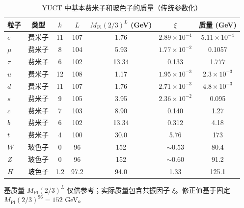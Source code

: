 \documentclass[11pt,a4paper]{article}
\begin{document}
	\begin{table}[H]
		\centering
		\caption{YUCT 中基本费米子和玻色子的质量（传统参数化）}
		\label{tab:fermions}
		\normalsize
		\begin{tabular}{l c c c c c c}
			\toprule
			粒子 & 类型 & \(k\) & \(L\) & \(M_{\mathrm{Pl}}(2/3)^L\) (GeV) & \(\xi\) & 质量 (GeV) \\
			\midrule
			\(e\) & 费米子 & 11 & 107 & 1.76 & \(2.89\times10^{-4}\) & \(5.11\times10^{-4}\) \\
			\(\mu\) & 费米子 & 8  & 104 & 5.93 & \(1.77\times10^{-2}\) & 0.1057 \\
			\(\tau\) & 费米子 & 6  & 102 & 13.34 & 0.133 & 1.777 \\
			\(u\) & 费米子 & 12 & 108 & 1.17 & \(1.95\times10^{-3}\) & \(2.3\times10^{-3}\) \\
			\(d\) & 费米子 & 11 & 107 & 1.76 & \(2.71\times10^{-3}\) & \(4.8\times10^{-3}\) \\
			\(s\) & 费米子 & 9  & 105 & 3.95 & \(2.36\times10^{-2}\) & 0.095 \\
			\(c\) & 费米子 & 7  & 103 & 8.90 & 0.140 & 1.27 \\
			\(b\) & 费米子 & 6  & 102 & 13.34 & 0.312 & 4.18 \\
			\(t\) & 费米子 & 4  & 100 & 30.0 & 5.76 & 173 \\
			\midrule
			\(W\) & 玻色子 & 0 & 96 & 152 & \(\sim0.53\) & 80.4 \\
			\(Z\) & 玻色子 & 0 & 96 & 152 & \(\sim0.60\) & 91.2 \\
			\(H\) & 玻色子 & 1.2 & 97.2 & 94.0 & 1.33 & 125.1 \\
			\bottomrule
		\end{tabular}
		\par\smallskip
		\footnotesize 基质量 \(M_{\mathrm{Pl}}(2/3)^L\) 仅供参考；实际质量包含共振因子 \(\xi\)。修正值基于固定 \(M_{\mathrm{Pl}}(2/3)^{96}=152\) GeV。
	\end{table}
	
\end{document}
